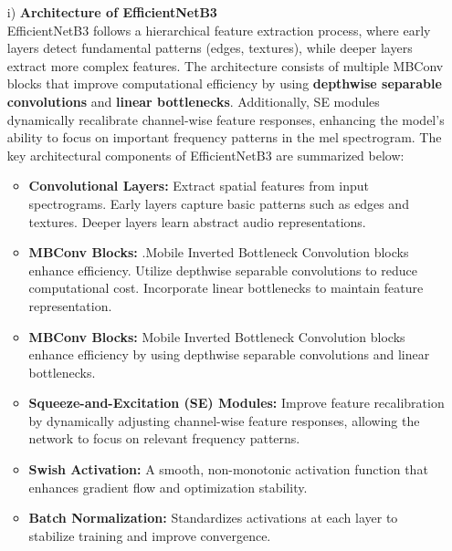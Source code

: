       \begin{itemize}
      \item[i)] \textbf{Architecture of EfficientNetB3} \\
            EfficientNetB3 follows a hierarchical feature extraction process, where early layers detect fundamental patterns (edges, textures), while deeper layers extract more complex features. The architecture consists of multiple MBConv blocks that improve computational efficiency by using \textbf{depthwise separable convolutions} and \textbf{linear bottlenecks}. Additionally, SE modules dynamically recalibrate channel-wise feature responses, enhancing the model’s ability to focus on important frequency patterns in the mel spectrogram.
            The key architectural components of EfficientNetB3 are summarized below:
            \begin{itemize}
                  \item \textbf{Convolutional Layers:} Extract spatial features from input spectrograms. Early layers capture basic patterns such as edges and textures. Deeper layers learn abstract audio representations.

                  \item \textbf{MBConv Blocks:} .Mobile Inverted Bottleneck Convolution blocks enhance efficiency. Utilize depthwise separable convolutions to reduce computational cost. Incorporate linear bottlenecks to maintain feature representation.

                  \item \textbf{MBConv Blocks:} Mobile Inverted Bottleneck Convolution blocks enhance efficiency by using depthwise separable convolutions and linear bottlenecks.
                  
                  \item \textbf{Squeeze-and-Excitation (SE) Modules:} Improve feature recalibration by dynamically adjusting channel-wise feature responses, allowing the network to focus on relevant frequency patterns.
                  
                  \item \textbf{Swish Activation:} A smooth, non-monotonic activation function that enhances gradient flow and optimization stability.
                  
                  \item \textbf{Batch Normalization:} Standardizes activations at each layer to stabilize training and improve convergence.
                  

\end{itemize}
\end{itemize}
